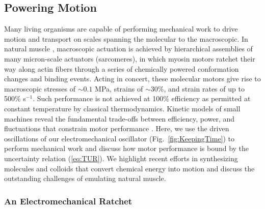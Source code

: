\begin{appendices}
\subsection{Powering Motion}

Many living organisms are capable of performing mechanical work to drive motion and transport on scales spanning the molecular to the macroscopic. In natural muscle \autocite{Alberts2015}, macroscopic actuation is achieved by hierarchical assemblies of many micron-scale actuators (sarcomeres), in which myosin motors ratchet their way along actin fibers through a series of chemically powered conformation changes and binding events. Acting in concert, these molecular motors give rise to macroscopic stresses of ${\sim}0.1$ MPa, strains of ${\sim}30$\%, and strain rates of up to 500\% s$^{-1}$.  Such performance is not achieved at 100\% efficiency as permitted at constant temperature by classical thermodynamics.  Kinetic models of small machines reveal the fundamental trade-offs between efficiency, power, and fluctuations that constrain motor performance \autocite{Pietzonka2016}. Here, we use the driven oscillations of our electromechanical oscillator (Fig.~\ref{fig:KeepingTime}) to perform mechanical work and discuss how motor performance is bound by the uncertainty relation (\ref{eq:TUR}).  We highlight recent efforts in synthesizing molecules and colloids that convert chemical energy into motion and discuss the outstanding challenges of emulating natural muscle.

\subsubsection{An Electromechanical Ratchet}


\end{appendices}

